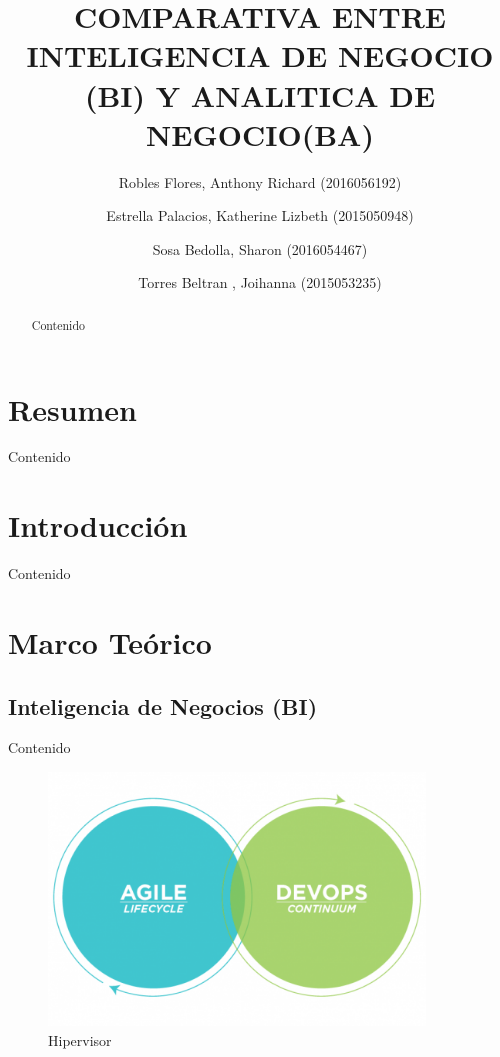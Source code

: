 \documentclass[preprint,12pt]{elsarticle}
\begin{document}
	
	\begin{frontmatter}

		\title{\huge  COMPARATIVA ENTRE INTELIGENCIA DE NEGOCIO (BI) Y ANALITICA DE NEGOCIO(BA) }
		\author{Robles Flores, Anthony Richard	                (2016056192)}
		\author{Estrella Palacios, Katherine Lizbeth			(2015050948)}
		\author{Sosa Bedolla, Sharon					(2016054467)}
		\author{Torres Beltran , Joihanna				(2015053235)}
		\address{Tacna, Perú}
		


\begin{abstract}
Contenido
\end{abstract}


\end{frontmatter}

\section{Resumen}
Contenido


\section{Introducción}
Contenido



\section{Marco Teórico}

	\subsection{Inteligencia de Negocios (BI)}
	Contenido\cite{referenciarobles1}



\begin{figure}[htb]
\begin{center}
\includegraphics[width=10cm]{./IMAGENES/evolucion}
\caption{Hipervisor}
\end{center}
\end{figure}
\end{document}
